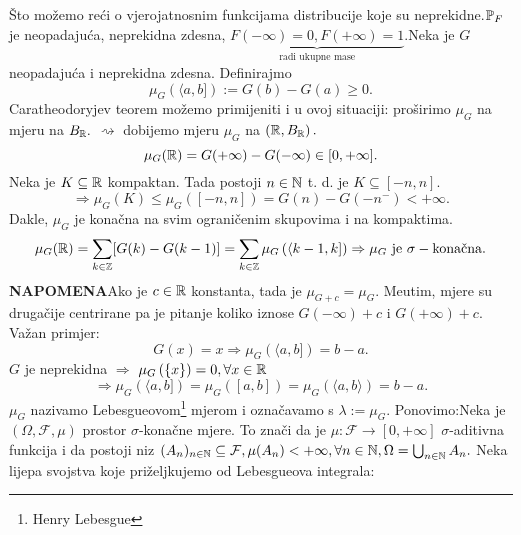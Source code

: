 \documentclass{article}
\begin{document}
Što možemo reći o vjerojatnosnim funkcijama distribucije koje su neprekidne.\newline \(\Bbb P_F\) je neopadajuća, neprekidna zdesna, \(\underbrace{F(-\infty)=0,F(+\infty)=1}_{\text{radi ukupne mase}}.\)\newline\newline  Neka je \(G\) neopadajuća i neprekidna zdesna. Definirajmo \[\mu_G\left(\langle a,b]\right):=G(b)-G(a)\ge 0.\] Caratheodoryjev teorem možemo primijeniti i u ovoj situaciji: proširimo \(\mu_G\) na mjeru na \(B_\Bbb R.\) \(\rightsquigarrow\) dobijemo mjeru \(\mu_G\) na \(\left(\Bbb R, B_\Bbb R\right).\) \[\mu_G(\Bbb R)=G(+\infty)-G(-\infty)\in[0,+\infty].\] Neka je \(K\subseteq\Bbb R\) kompaktan. Tada postoji \(n\in\Bbb N\) t. d. je \(K\subseteq[-n,n].\) \[\Rightarrow\mu_G(K)\le\mu_G\left([-n,n]\right)=G(n)-G(-n^-)<+\infty.\] Dakle, \(\mu_G\) je konačna na svim ograničenim skupovima i na kompaktima. \[\mu_G(\Bbb R)=\sum_{k\in\Bbb Z}[G(k)-G(k-1)]=\sum_{k\in\Bbb Z}\mu_G\left(\langle k-1,k]\right)\Rightarrow\mu_G\text{ je }\sigma-\text{konačna}.\]
\textbf{NAPOMENA}\newline Ako je \(c\in\Bbb R\) konstanta, tada je \(\boxed{\mu_{G+c}=\mu_G}.\) Me\dj{}utim, mjere su drugačije centrirane pa je pitanje koliko iznose \(G(-\infty)+c\) i \(G(+\infty)+c.\)\newline\newline Važan primjer: \[G(x)=x\Rightarrow\mu_G\left(\langle a,b]\right)=b-a.\] \(G\) je neprekidna \(\Rightarrow\) \(\mu_G\left(\{x\}\right)=0,\forall x\in\Bbb R\) \[\Rightarrow \mu_G\left(\langle a,b]\right)=\mu_G\left([a,b]\right)=\mu_G\left(\langle a,b\rangle\right)=b-a.\] \(\mu_G\) nazivamo Lebesgueovom\footnote[50]{Henry Lebesgue} mjerom i označavamo s \(\lambda:=\mu_G.\)\newline\newline
Ponovimo:\newline Neka je \((\Omega,\mathcal F,\mu)\) prostor \(\sigma\)-konačne mjere. To znači da je \(\mu:\mathcal F\to[0,+\infty]\) \(\sigma\)-aditivna funkcija i da postoji niz \((A_n)_{n\in\Bbb N}\subseteq\mathcal F,\mu(A_n)<+\infty,\forall n\in\Bbb N,\Omega=\bigcup_{n\in\Bbb N}A_n.\)\newline\newline 
Neka lijepa svojstva koje priželjkujemo od Lebesgueova integrala:
\end{document}
